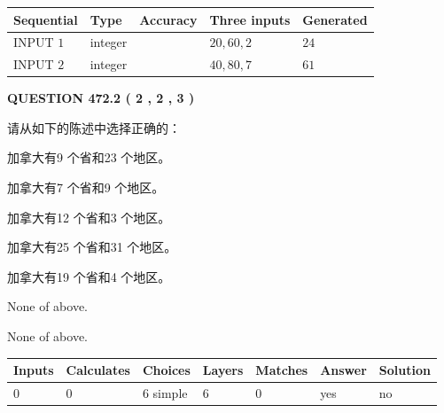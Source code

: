 \documentclass{ctexart}
\begin{document}
   
  
  
\noindent\begin{tabular}{|l|l|l|l|l|}
\hline
 Sequential & Type & Accuracy & Three inputs & Generated \\ 
\hline
 
 
  INPUT $  1 $ & integer &  & $
 20
 , 
 60
 , 
 2
 $ & $ 24 $ 
 \\  \hline  
 
 
  INPUT $  2 $ & integer &  & $
 40
 , 
 80
 , 
 7
 $ & $ 61 $ 
 \\  \hline  
 \end{tabular}
   
   
  
\vspace{0.2in}
  
{\textbf{\Large{QUESTION
472.2 
 ( 2 , 2 , 3 )
}}}
  
  
请从如下的陈述中选择正确的：
 
 
加拿大有9 个省和23 个地区。
 
 
加拿大有7 个省和9 个地区。
 
 
加拿大有12 个省和3 个地区。
 
 
加拿大有25 个省和31 个地区。
 
 
加拿大有19 个省和4 个地区。
 
 
 None of above.
 
 
\noindent{}
 
 
 None of above.
 
 
\noindent{}
 
 
   
   
   
   
\noindent\begin{tabular}{|l|l|l|l|l|l|l|}
 \hline
Inputs & Calculates & Choices & Layers & Matches & Answer & Solution \\ \hline
 0  & 
 0  & 
 6
  simple  
  & 
 6  & 
 0  & 
  yes & 
  no 
  \\ \hline
 \end{tabular}
   
   
   
   
\noindent{}
   
\end{document}
